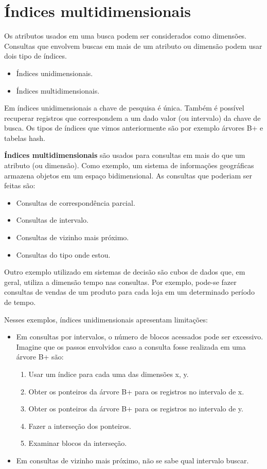 \section{Índices multidimensionais}

Os atributos usados em uma busca podem ser considerados como dimensões.
Consultas que envolvem buscas em mais de um atributo ou dimensão podem
usar dois tipo de índices.
\begin{itemize}
\item Índices unidimensionais.
\item Índices multidimensionais.
\end{itemize}

Em índices unidimensionais a chave de pesquisa é única. Também é possível
recuperar registros que correspondem a um dado valor (ou intervalo)
da chave de busca. Os tipos de índices que vimos anteriormente 
são por exemplo árvores B+ e tabelas hash.

\textbf{Índices multidimensionais} são usados para consultas em mais do que um
atributo (ou dimensão).
Como exemplo, um sistema de informações geográficas armazena objetos 
em um espaço bidimensional. As consultas que poderiam ser feitas são:
\begin{itemize}
\item Consultas de correspondência parcial.
\item Consultas de intervalo.
\item Consultas de vizinho mais próximo.
\item Consultas do tipo onde estou.
\end{itemize}
Outro exemplo utilizado em sistemas de decisão são cubos de dados que, em geral, 
utiliza a dimensão tempo nas consultas. Por exemplo, pode-se fazer consultas
de vendas de um produto para cada loja em um determinado período de tempo.

Nesses exemplos, índices unidimensionais apresentam limitações:
\begin{itemize}
\item Em consultas por intervalos, o número de blocos acessados pode ser excessivo. Imagine
que os passos envolvidos caso a consulta fosse realizada em uma árvore B+ são:
	\begin{enumerate}
	\item Usar um índice para cada uma das dimensões x, y.
	\item Obter os ponteiros da árvore B+ para os registros no intervalo de x.
	\item Obter os ponteiros da árvore B+ para os registros no intervalo de y.
	\item Fazer a interseção dos ponteiros.
	\item Examinar blocos da interseção.
	\end{enumerate}
\item Em consultas de vizinho mais próximo, não se sabe qual intervalo buscar.
\end{itemize}

